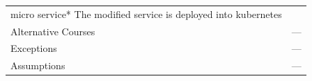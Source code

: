\begin{longtable}[]{@{}ll@{}}
\begin{minipage}[t]{0.68\columnwidth}
micro service* The modified service is deployed into kubernetes\strut
\end{minipage}\tabularnewline
\begin{minipage}[t]{0.27\columnwidth}\raggedright\strut
Alternative Courses\strut
\end{minipage} & \begin{minipage}[t]{0.68\columnwidth}\raggedright\strut
---\strut
\end{minipage}\tabularnewline
\begin{minipage}[t]{0.27\columnwidth}\raggedright\strut
Exceptions\strut
\end{minipage} & \begin{minipage}[t]{0.68\columnwidth}\raggedright\strut
---\strut
\end{minipage}\tabularnewline
\begin{minipage}[t]{0.27\columnwidth}\raggedright\strut
Assumptions\strut
\end{minipage} & \begin{minipage}[t]{0.68\columnwidth}\raggedright\strut
---\strut
\end{minipage}\tabularnewline
\bottomrule
\end{longtable}

